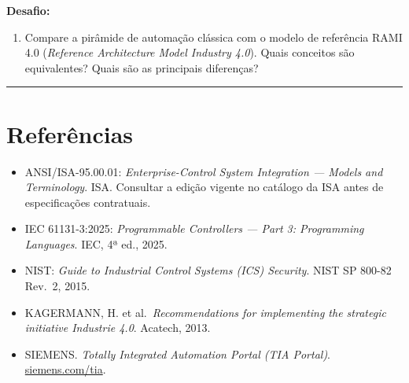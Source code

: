 \textbf{Desafio:}

\begin{enumerate}
\def\labelenumi{\arabic{enumi}.}
\setcounter{enumi}{5}
\tightlist
\item
  Compare a pirâmide de automação clássica com o modelo de referência RAMI 4.0 (\emph{Reference Architecture Model Industry 4.0}). Quais conceitos são equivalentes? Quais são as principais diferenças?
\end{enumerate}

\begin{center}\rule{0.5\linewidth}{0.5pt}\end{center}

\section{Referências}\label{referuxeancias}

\begin{itemize}
\tightlist
\item
  ANSI/ISA-95.00.01: \emph{Enterprise-Control System Integration --- Models and Terminology}. ISA. Consultar a edição vigente no catálogo da ISA antes de especificações contratuais.
\item
  IEC 61131-3:2025: \emph{Programmable Controllers --- Part 3: Programming Languages}. IEC, 4ª ed., 2025.
\item
  NIST: \emph{Guide to Industrial Control Systems (ICS) Security}. NIST SP 800-82 Rev.~2, 2015.
\item
  KAGERMANN, H. et al.~\emph{Recommendations for implementing the strategic initiative Industrie 4.0}. Acatech, 2013.
\item
  SIEMENS. \emph{Totally Integrated Automation Portal (TIA Portal)}. \url{siemens.com/tia}.
\end{itemize}
